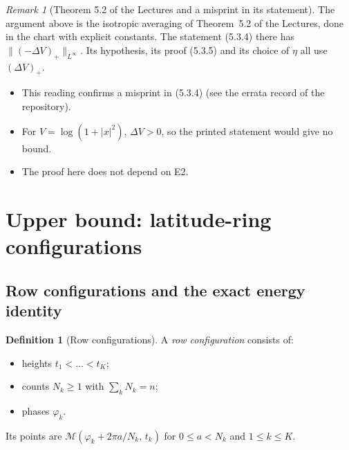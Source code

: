 \documentclass[11pt]{article}
\theoremstyle{definition}
\newtheorem{definition}[theorem]{Definition}
\theoremstyle{remark}
\newtheorem{remark}[theorem]{Remark}
\begin{document}
\begin{remark}[Theorem 5.2 of the Lectures and a misprint in its statement]\label{rem:E2}
The argument above is the isotropic averaging of Theorem~5.2 of the Lectures, done in
the chart with explicit constants. The statement (5.3.4) there has
$\|(-\Delta V)_+\|_{L^\infty}$. Its hypothesis, its proof (5.3.5) and
its choice of $\eta$ all use $(\Delta V)_+$.
\begin{itemize}[leftmargin=*]
\item This reading confirms a misprint in (5.3.4) (see the errata record of the repository).
\item For $V=\log(1+|x|^2)$, $\Delta V>0$, so the printed statement would give no bound.
\item The proof here does not depend on E2.
\end{itemize}
\end{remark}

\section{Upper bound: latitude-ring configurations}\label{sec:UB}

\subsection{Row configurations and the exact energy identity}

\begin{definition}[Row configurations]\label{def:rows}
A \emph{row configuration} consists of:
\begin{itemize}[leftmargin=*]
\item heights $t_1<\dots<t_K$;
\item counts $N_k\ge1$ with $\sum_kN_k=n$;
\item phases $\varphi_k$.
\end{itemize}
Its points are $\mathcal M(\varphi_k+2\pi a/N_k,\,t_k)$ for $0\le a<N_k$ and $1\le k\le K$.
\end{definition}
\end{document}
